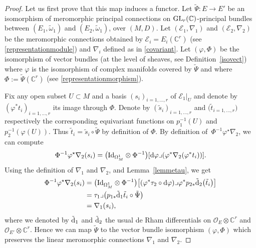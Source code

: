 \documentclass[10pt,a4paper]{amsart}
\numberwithin{equation}{section}
\begin{document}
\begin{proof} Let us first prove that this map induces a functor. Let $\tilde{\Psi}\colon E \longrightarrow E'$ be an isomorphism of meromorphic principal connections on ${\rm GL}_r(\mathbb{C})$-principal bundles between $(E_1,\tilde{\omega}_1)$ and $(E_2,\tilde{\omega}_1)$, over $(M,D)$. Let $(\mathcal{E}_1,\nabla_1)$ and $(\mathcal{E}_2,\nabla_2)$ be the meromorphic connections obtained by $\mathcal{E}_i=E_i(\mathbb{C}^r)$ (see \eqref{representationmodule}) and $\nabla_i$ defined as in \eqref{covariant}. Let $(\varphi,\Phi)$ be the isomorphism of vector bundles (at the level of sheaves, see Definition~\ref{isovect}) where $\varphi$ is the isomorphism of complex manifolds covered by $\tilde{\Psi}$ and where $\Phi:=\tilde{\Psi}(\mathbb{C}^r)$ (see \eqref{representationmorphism}).

Fix any open subset $U\subset M$ and a basis $(s_i)_{i=1,\dots,r}$ of $\mathcal{E}_1\vert_U$ and denote by $(\varphi^* t_i)_{i=1,\dots,r}$ its image through $\Phi$. Denote by $(\tilde{s}_i)_{i=1,\dots,r}$ and $\big(\tilde{t}_{i=1,\dots,r}\big)$ respectively the corresponding equivariant functions on $p_1^{-1}(U)$ and $p_2^{-1}(\varphi(U))$. Thus $\tilde{t}_i = \tilde{s}_i \circ \tilde{\Psi}$ by definition of $\Phi$. By definition of~$\Phi^{-1} \varphi^\star \nabla_2$, we can compute
\begin{gather*}
\Phi^{-1} \varphi^\star \nabla_2(s_i) = \big({\rm Id}_{\Omega^1_{M}} \otimes \Phi^{-1}\big)[{\rm d}\varphi \lrcorner (\varphi^* \nabla_2 (\varphi^* t_i))]. \end{gather*}
Using the definition of $\nabla_1$ and $\nabla_2$, and Lemma~\ref{lemmetau}, we get
\begin{align*}
 \Phi^{-1} \varphi^\star \nabla_2(s_i)&= \big({\rm Id}_{\Omega^1_{M}} \otimes \Phi^{-1}\big)\big[ (\varphi^*\tau_2\circ {\rm d}\varphi) \lrcorner \varphi^* p_{2*}\tilde{{\rm d}}_2\big(\tilde{t}_i\big)\big]\\
 &= \tau_1 \lrcorner \big(p_{1*}\tilde{{\rm d}}_1\tilde{t}_i \circ \tilde{\Psi}\big) \\
 &=\nabla_1(s_i), \end{align*}
 where we denoted by $\tilde{{\rm d}}_1$ and $\tilde{{\rm d}}_2$ the usual de Rham differentials on $\mathcal{O}_{E}\otimes \mathbb{C}^r$ and $\mathcal{O}_{E'}\otimes \mathbb{C}^r$. Hence we can map $\tilde{\Psi}$ to the vector bundle isomorphism $(\varphi,\Phi)$ which preserves the linear meromorphic connections $\nabla_1$ and $\nabla_2$.



\end{proof}
\end{document}
